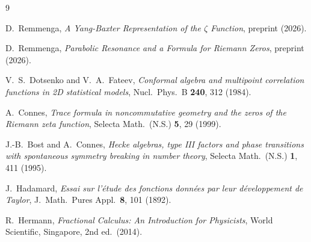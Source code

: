 \documentclass[%
 aip,
 amsmath,amssymb,
 reprint,%
]{revtex4-1}
\theoremstyle{plain}
\theoremstyle{definition}
\begin{document}
\begin{thebibliography}{9}

D.~Remmenga,
\textit{A Yang-Baxter Representation of the $\zeta$ Function},
preprint (2026).

D.~Remmenga,
\textit{Parabolic Resonance and a Formula for Riemann Zeros},
preprint (2026).

V.~S.~Dotsenko and V.~A.~Fateev,
\textit{Conformal algebra and multipoint correlation functions in 2D statistical models},
Nucl.\ Phys.\ B \textbf{240}, 312 (1984).

A.~Connes,
\textit{Trace formula in noncommutative geometry and the zeros of the Riemann zeta function},
Selecta Math.\ (N.S.) \textbf{5}, 29 (1999).

J.-B.~Bost and A.~Connes,
\textit{Hecke algebras, type III factors and phase transitions with spontaneous symmetry breaking
in number theory},
Selecta Math.\ (N.S.) \textbf{1}, 411 (1995).

J.~Hadamard,
\textit{Essai sur l'\'etude des fonctions donn\'ees par leur d\'eveloppement de Taylor},
J.\ Math.\ Pures Appl.\ \textbf{8}, 101 (1892).

R.~Hermann,
\textit{Fractional Calculus: An Introduction for Physicists},
World Scientific, Singapore, 2nd ed.\ (2014).

\end{thebibliography}
\end{document}
